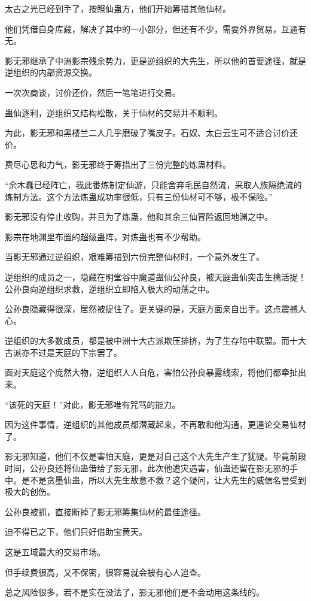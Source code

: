 \begin{this_body}
太古之光已经到手了，按照仙蛊方，他们开始筹措其他仙材。

他们凭借自身库藏，解决了其中的一小部分，但还有不少，需要外界贸易，互通有无。

影无邪继承了中洲影宗残余势力，更是逆组织的大先生，所以他的首要途径，就是逆组织的内部资源交换。

一次次商谈，讨价还价，然后一笔笔进行交易。

蛊仙逐利，逆组织又结构松散，关于仙材的交易并不顺利。

为此，影无邪和黑楼兰二人几乎磨破了嘴皮子。石奴、太白云生可不适合讨价还价。

费尽心思和力气，影无邪终于筹措出了三份完整的炼蛊材料。

“余木蠢已经阵亡，我此番炼制定仙游，只能舍弃毛民自然流，采取人族隔绝流的炼制方法。这个方法炼蛊成功率很低，只有三份仙材可不够，极不保险。”

影无邪没有停止收购，并且为了炼蛊，他和其余三仙冒险返回地渊之中。

影宗在地渊里布置的超级蛊阵，对炼蛊也有不少帮助。

当影无邪通过逆组织，艰难筹措到六份完整仙材时，一个意外发生了。

逆组织的成员之一，隐藏在明堂谷中魔道蛊仙公孙良，被天庭蛊仙突击生擒活捉！公孙良向逆组织求救，逆组织立即陷入极大的动荡之中。

公孙良隐藏得很深，居然被捉住了。更关键的是，天庭方面亲自出手。这点震撼人心。

逆组织的大多数成员，都是被中洲十大古派欺压排挤，为了生存暗中联盟。而十大古派亦不过是天庭的下宗罢了。

面对天庭这个庞然大物，逆组织人人自危，害怕公孙良暴露线索，将他们都牵扯出来。

“该死的天庭！”对此，影无邪唯有咒骂的能力。

因为这件事情，逆组织的其他成员都潜藏起来，不再敢和他沟通，更遑论交易仙材了。

影无邪知道，他们不仅是害怕天庭，更是对自己这个大先生产生了犹疑。毕竟前段时间，公孙良还将仙蛊借给了影无邪，此次他遭灾遇害，仙蛊还留在影无邪的手中。是不是贪墨仙蛊，所以大先生故意不救？这个疑问，让大先生的威信名誉受到极大的创伤。

公孙良被抓，直接断掉了影无邪筹集仙材的最佳途径。

迫不得已之下，他们只好借助宝黄天。

这是五域最大的交易市场。

但手续费很高，又不保密，很容易就会被有心人追查。

总之风险很多，若不是实在没法了，影无邪他们是不会动用这条线的。


\end{this_body}
